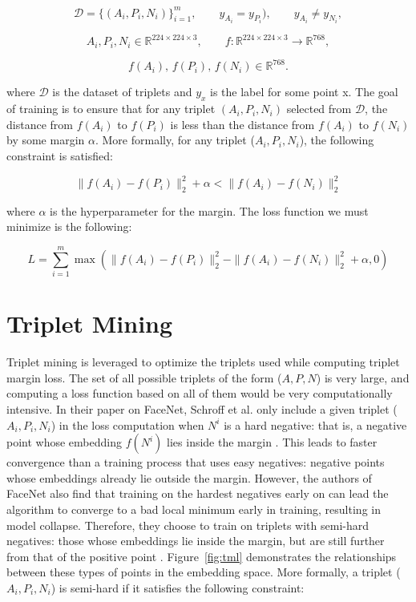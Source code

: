 \documentclass{article}
\begin{document}
\[
\mathcal{D} = \{(A_i, P_i, N_i)\}_{i=1}^m,\qquad
y_{A_i} = y_{P_i}),\qquad y_{A_i} \neq y_{N_i},
\]

\[
A_i, P_i, N_i \in \mathbb{R}^{224 \times 224 \times 3}, \qquad
f : \mathbb{R}^{224 \times 224 \times 3} \to \mathbb{R}^{768},
\]

\[
f(A_i),\, f(P_i),\, f(N_i) \in \mathbb{R}^{768}.
\]

where $\mathcal{D}$ is the dataset of triplets and $y_x$ is the label for some point x. The goal of training is to ensure that for any triplet $(A_i, P_i, N_i)$ selected from $\mathcal{D}$, the distance from $f(A_i)$ to $f(P_i)$ is less than the distance from $f(A_i)$ to $f(N_i)$ by some margin $\alpha$. More formally, for any triplet ($A_i, P_i, N_i$), the following constraint is satisfied: 

$$
\|f(A_i) - f(P_i)\|_2^2 + \alpha < \|f(A_i) - f(N_i)\|_2^2
$$

where $\alpha$ is the hyperparameter for the margin. The loss function we must minimize is the following: 

$$
L = \sum_{i=1}^{m} \max \left( \|f(A_i) - f(P_i)\|_2^2 - \|f(A_i) - f(N_i)\|_2^2 + \alpha, 0 \right)
$$

\section{Triplet Mining}
\label{app:mining}

Triplet mining is leveraged to optimize the triplets used while computing triplet margin loss. The set of all possible triplets of the form ($A, P, N$) is very large, and computing a loss function based on all of them would be very computationally intensive. In their paper on FaceNet, Schroff et al. only include a given triplet ($A_i, P_i, N_i$) in the loss computation when $N^i$ is a hard negative: that is, a negative point whose embedding $f(N^i)$ lies inside the margin \cite{Schroff_2015_CVPR}. This leads to faster convergence than a training process that uses easy negatives: negative points whose embeddings already lie outside the margin. However, the authors of FaceNet also find that training on the hardest negatives early on can lead the algorithm to converge to a bad local minimum early in training, resulting in model collapse. Therefore, they choose to train on triplets with semi-hard negatives: those whose embeddings lie inside the margin, but are still further from that of the positive point \cite{Schroff_2015_CVPR}. Figure~\ref{fig:tml} demonstrates the relationships between these types of points in the embedding space. More formally, a triplet ($A_i, P_i, N_i$) is semi-hard if it satisfies the following constraint: 
\end{document}
